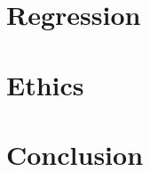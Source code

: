 \documentclass{article}
\begin{document}
\section{Regression}


\section{Ethics}


\section{Conclusion}
\end{document}

